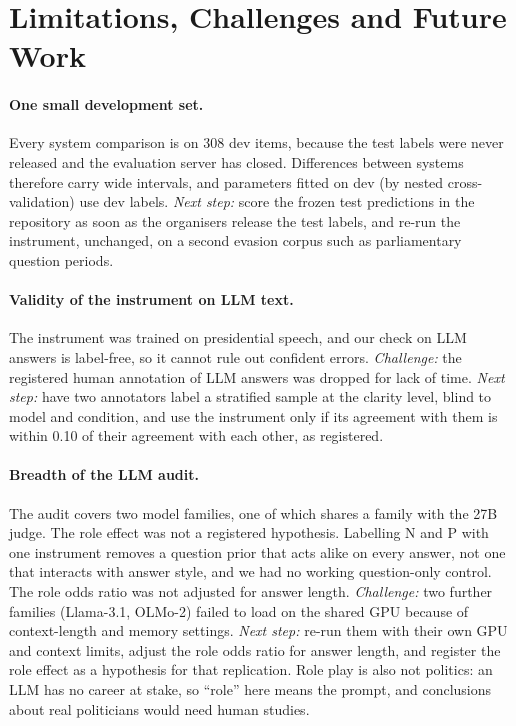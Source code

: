 \section*{Limitations, Challenges and Future Work}

\paragraph{One small development set.}
Every system comparison is on 308 dev items, because the test labels were never released and the evaluation server has closed.
Differences between systems therefore carry wide intervals, and parameters fitted on dev (by nested cross-validation) use dev labels.
\emph{Next step:} score the frozen test predictions in the repository as soon as the organisers release the test labels, and re-run the instrument, unchanged, on a second evasion corpus such as parliamentary question periods.

\paragraph{Validity of the instrument on LLM text.}
The instrument was trained on presidential speech, and our check on LLM answers is label-free, so it cannot rule out confident errors.
\emph{Challenge:} the registered human annotation of LLM answers was dropped for lack of time.
\emph{Next step:} have two annotators label a stratified sample at the clarity level, blind to model and condition, and use the instrument only if its agreement with them is within 0.10 of their agreement with each other, as registered.

\paragraph{Breadth of the LLM audit.}
The audit covers two model families, one of which shares a family with the 27B judge. The role effect was not a registered hypothesis. Labelling N and P with one instrument removes a question prior that acts alike on every answer, not one that interacts with answer style, and we had no working question-only control. The role odds ratio was not adjusted for answer length.
\emph{Challenge:} two further families (Llama-3.1, OLMo-2) failed to load on the shared GPU because of context-length and memory settings.
\emph{Next step:} re-run them with their own GPU and context limits, adjust the role odds ratio for answer length, and register the role effect as a hypothesis for that replication.
Role play is also not politics: an LLM has no career at stake, so ``role'' here means the prompt, and conclusions about real politicians would need human studies.

